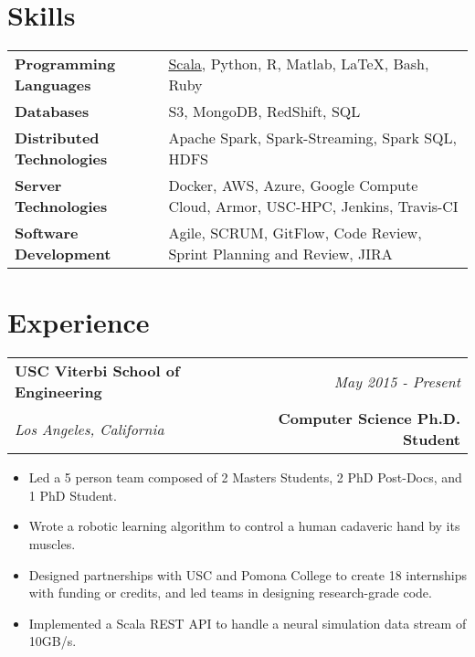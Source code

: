 \documentclass[10pt,a4paper]{article}
\begin{document}
  \newpage

\vspace*{-15mm}\section*{Skills}
  \noindent\begin{tabularx}{17cm}{l X}
    \textbf{Programming Languages} & \href{https://github.com/bcohn12/space/blob/master/src/main/scala/bbdl/space/MyAdder.scala}{Scala}, Python, R, Matlab, \LaTeX, Bash, Ruby \\
    \textbf{Databases} & S3, MongoDB, RedShift, SQL \\
    \textbf{Distributed Technologies} & Apache Spark, Spark-Streaming, Spark SQL, HDFS \\
    \textbf{Server Technologies} & Docker, AWS, Azure, Google Compute Cloud, Armor, USC-HPC, Jenkins, Travis-CI \\
    \textbf{Software Development} & Agile, SCRUM, GitFlow, Code Review, Sprint Planning and Review, JIRA \\
  \end{tabularx}



    \vspace*{3mm}\section*{Experience}
  \noindent\begin{tabularx}{17cm}{X r}
    \textbf{USC Viterbi School of Engineering} & \textit{May 2015 - Present} \\
    \textit{Los Angeles, California} & \textbf{Computer Science Ph.D. Student} \\
  \end{tabularx}

  \vspace*{1mm}\noindent\begin{minipage}{17cm}
    \begin{itemize}[leftmargin=6mm,topsep=0mm,itemsep=-1mm]
      \item Led a 5 person team composed of 2 Masters Students, 2 PhD Post-Docs, and 1 PhD Student.
      \item Wrote a robotic learning algorithm to control a human cadaveric hand by its muscles. 
     \item Designed partnerships with USC and Pomona College to create 18 internships with funding or credits, and led teams in designing research-grade code.
      \item Implemented a Scala REST API to handle a neural simulation data stream of 10GB/s.
    \end{itemize}
  \end{minipage}
\end{document}
